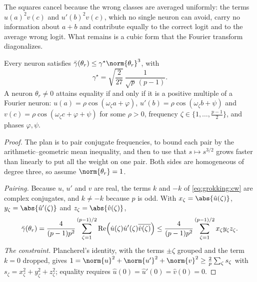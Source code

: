 \begin{refsection}
The squares cancel because the wrong classes are averaged uniformly: the terms $u(a)^2v(c)$ and $u'(b)^2v(c)$, which no single neuron can avoid, carry no information about $a+b$ and contribute equally to the correct logit and to the average wrong logit. What remains is a cubic form that the Fourier transform diagonalizes.

\begin{theorem}\label{thm:grokking:neuron}
Every neuron satisfies $\grokcw(\theta_r)\le\gamma^\star\norm{\theta_r}^3$, with
\[
  \gamma^\star=\sqrt{\frac2{27}}\,\frac1{\sqrt p\,(p-1)} .
\]
A neuron $\theta_r\ne0$ attains equality if and only if it is a positive multiple of a Fourier neuron: $u(a)=\rho\cos(\omega_\zeta a+\varphi)$, $u'(b)=\rho\cos(\omega_\zeta b+\psi)$ and $v(c)=\rho\cos(\omega_\zeta c+\varphi+\psi)$ for some $\rho>0$, frequency $\zeta\in\{1,\dots,\frac{p-1}2\}$, and phases $\varphi,\psi$.
\end{theorem}

\begin{proof}
The plan is to pair conjugate frequencies, to bound each pair by the arithmetic--geometric mean inequality, and then to use that $s\mapsto s^{3/2}$ grows faster than linearly to put all the weight on one pair. Both sides are homogeneous of degree three, so assume $\norm{\theta_r}=1$.

\emph{Pairing.} Because $u$, $u'$ and $v$ are real, the terms $k$ and $-k$ of \eqref{eq:grokking:cw} are complex conjugates, and $k\ne-k$ because $p$ is odd. With $x_\zeta=\abs{\hat u(\zeta)}$, $y_\zeta=\abs{\hat u'(\zeta)}$ and $z_\zeta=\abs{\hat v(\zeta)}$,
\[
  \bar\gamma(\theta_r)=\frac4{(p-1)p^2}\sum_{\zeta=1}^{(p-1)/2}\operatorname{Re}\Bigl(\hat u(\zeta)\hat u'(\zeta)\overline{\hat v(\zeta)}\Bigr)\le\frac4{(p-1)p^2}\sum_{\zeta=1}^{(p-1)/2}x_\zeta y_\zeta z_\zeta .
\]
\emph{The constraint.} Plancherel's identity, with the terms $\pm\zeta$ grouped and the term $k=0$ dropped, gives $1=\norm{u}^2+\norm{u'}^2+\norm{v}^2\ge\frac2p\sum_\zeta s_\zeta$ with $s_\zeta=x_\zeta^2+y_\zeta^2+z_\zeta^2$; equality requires $\hat u(0)=\hat u'(0)=\hat v(0)=0$.


\end{proof}
\end{refsection}
